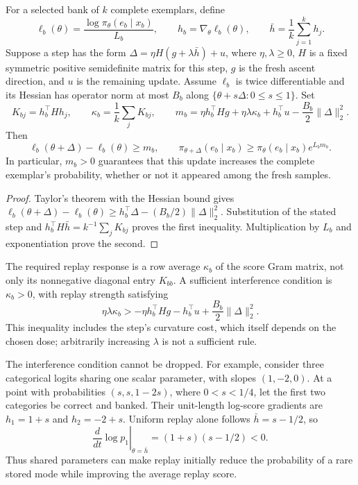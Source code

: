 \begin{proposition}
\enforcehalffinalproseline
\label{prop:neural-replay-local-response}
For a selected bank of $k$ complete exemplars, define
\[
 \ell_b(\theta)=\frac{\log\pi_\theta(e_b\mid x_b)}{L_b},\qquad
 h_b=\nabla_\theta\ell_b(\theta),\qquad
 \bar h=\frac1k\sum_{j=1}^k h_j.
\]
Suppose a step has the form
$\Delta=\eta H(g+\lambda\bar h)+u$, where $\eta,\lambda\ge0$,
$H$ is a fixed symmetric positive semidefinite matrix for this step,
$g$ is the fresh ascent direction, and $u$ is the remaining update.
Assume $\ell_b$ is twice differentiable and its Hessian has operator norm
at most $B_b$ along $\{\theta+s\Delta:0\le s\le1\}$.
Set
\[
 K_{bj}=h_b^\top Hh_j,\qquad
 \kappa_b=\frac1k\sum_jK_{bj},\qquad
 m_b=\eta h_b^\top Hg+\eta\lambda\kappa_b
       +h_b^\top u-\frac{B_b}{2}\|\Delta\|_2^2.
\]
Then
\begin{equation}
 \ell_b(\theta+\Delta)-\ell_b(\theta)\ge m_b,
 \qquad
 \pi_{\theta+\Delta}(e_b\mid x_b)
    \ge\pi_\theta(e_b\mid x_b)e^{L_bm_b}.
 \label{eq:neural-replay-local-response}
\end{equation}
In particular, $m_b>0$ guarantees that this update increases the complete
exemplar's probability, whether or not it appeared among the fresh samples.
\end{proposition}

\begin{proof}
\enforcehalffinalproseline
Taylor's theorem with the Hessian bound gives
$\ell_b(\theta+\Delta)-\ell_b(\theta)
 \ge h_b^\top\Delta-(B_b/2)\|\Delta\|_2^2$.
Substitution of the stated step and
$h_b^\top H\bar h=k^{-1}\sum_jK_{bj}$ proves the first inequality.
Multiplication by $L_b$ and exponentiation prove the second.
\end{proof}

The required replay response is a row average $\kappa_b$ of the score Gram
matrix, not only its nonnegative diagonal entry $K_{bb}$. A sufficient
interference condition is $\kappa_b>0$, with replay strength satisfying
\[
 \eta\lambda\kappa_b>
   -\eta h_b^\top Hg-h_b^\top u
       +\frac{B_b}{2}\|\Delta\|_2^2.
\]
This inequality includes the step's curvature cost, which itself depends on
the chosen dose; arbitrarily increasing $\lambda$ is not a sufficient rule.

The interference condition cannot be dropped. For example, consider three
categorical logits sharing one scalar parameter, with slopes $(1,-2,0)$.
At a point with probabilities $(s,s,1-2s)$, where $0<s<1/4$, let the first
two categories be correct and banked. Their unit-length log-score gradients
are $h_1=1+s$ and $h_2=-2+s$. Uniform replay alone follows
$\bar h=s-1/2$, so
\[
 \left.\frac{d}{dt}\log p_1\right|_{\dot\theta=\bar h}
   =(1+s)(s-1/2)<0.
\]
Thus shared parameters can make replay initially reduce the probability of
a rare stored mode while improving the average replay score.


